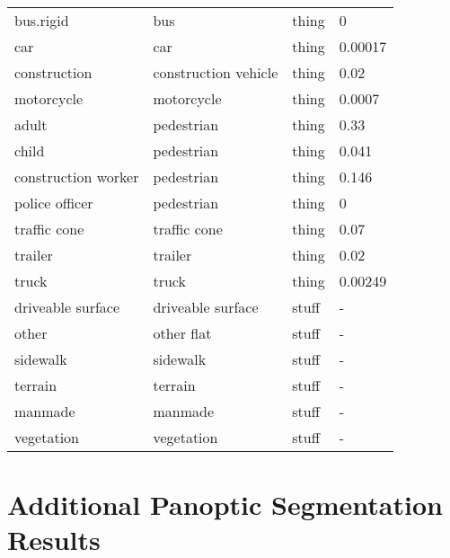 \documentclass[letterpaper, 10 pt, journal, twoside]{IEEEtran}
\begin{document}
\begin{table}
\begin{tabular}{|l | C{2.0cm} | C{1.5cm}| C{1.5cm} |}
bus.rigid                                &   bus                   & thing   & 0       \\ 
car                                      &   car                   & thing   & 0.00017       \\ 
construction                             &   construction vehicle  & thing   & 0.02       \\ 
motorcycle                               &   motorcycle            & thing   & 0.0007       \\ 
adult                                    &   pedestrian            & thing  & 0.33        \\ 
child                                    &   pedestrian            & thing  & 0.041        \\ 
construction worker                      &   pedestrian            & thing  & 0.146       \\ 
police officer                           &   pedestrian            & thing  & 0        \\ 
traffic cone                              &   traffic cone         & thing   & 0.07       \\ 
trailer                                  &   trailer               & thing   & 0.02       \\ 
truck                                    &   truck                 & thing   & 0.00249       \\ 
driveable surface                        &   driveable surface     & stuff  & -        \\ 
other                                    &   other flat            & stuff   & -       \\ 
sidewalk                                 &   sidewalk              & stuff   & -      \\ 
terrain                                  &   terrain               & stuff   & -       \\ 
manmade                                  &   manmade               & stuff   & -       \\ 
vegetation                               &   vegetation            & stuff  & -        \\
\bottomrule
\end{tabular}
\label{table:class_map}
\end{table}

\section{Additional Panoptic Segmentation Results}
\end{document}

